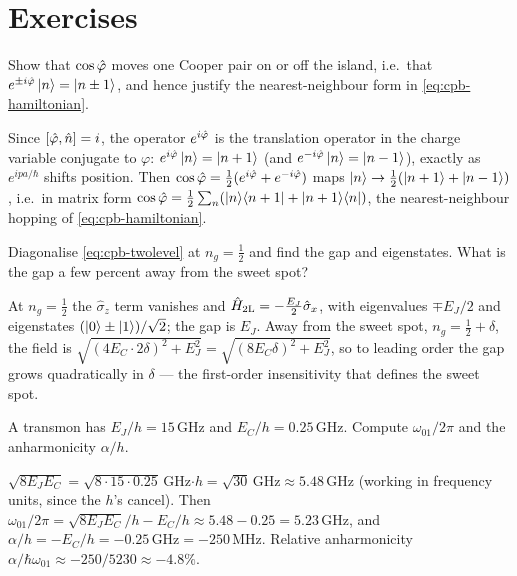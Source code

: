 \section*{Exercises}

\begin{exercise}
Show that $\cos\hat{\varphi}$ moves one Cooper pair on or off the island,
i.e.\ that
$e^{\pm i\hat{\varphi}}\ket n=\ket{n\pm1}$, and hence justify the
nearest-neighbour form in \cref{eq:cpb-hamiltonian}.
\begin{solution}
Since $\comm{\op\varphi}{\op n}=i$, the operator $e^{i\hat{\varphi}}$ is
the translation operator in the charge variable conjugate to
$\varphi$: $e^{i\hat{\varphi}}\ket n=\ket{n+1}$ (and $e^{-i\hat{\varphi}}\ket n=\ket{n-1}$),
exactly as $e^{ipa/\hbar}$ shifts position. Then
$\cos\hat{\varphi}=\tfrac12(e^{i\hat{\varphi}}+e^{-i\hat{\varphi}})$ maps
$\ket n\to\tfrac12(\ket{n+1}+\ket{n-1})$, i.e.\ in matrix form
$\cos\hat{\varphi}=\tfrac12\sum_n(\ket n\!\bra{n+1}+\ket{n+1}\!\bra n)$,
the nearest-neighbour hopping of \cref{eq:cpb-hamiltonian}.
\end{solution}
\end{exercise}

\begin{exercise}
Diagonalise \cref{eq:cpb-twolevel} at $n_g=\tfrac12$ and find the gap
and eigenstates. What is the gap a few percent away from the sweet
spot?
\begin{solution}
At $n_g=\tfrac12$ the $\hat\sigma_z$ term vanishes and
$\hat{H}_{\rm 2L}=-\tfrac{E_J}{2}\hat\sigma_x$, with eigenvalues
$\mp E_J/2$ and eigenstates $(\ket0\pm\ket1)/\sqrt2$; the gap is $E_J$.
Away from the sweet spot, $n_g=\tfrac12+\delta$, the field is
$\sqrt{(4E_C\cdot2\delta)^2+E_J^2}=\sqrt{(8E_C\delta)^2+E_J^2}$, so to
leading order the gap grows quadratically in $\delta$ --- the
first-order insensitivity that defines the sweet spot.
\end{solution}
\end{exercise}

\begin{exercise}
A transmon has $E_J/h=15\,$GHz and $E_C/h=0.25\,$GHz. Compute
$\omega_{01}/2\pi$ and the anharmonicity $\alpha/h$.
\begin{solution}
$\sqrt{8E_JE_C}=\sqrt{8\cdot15\cdot0.25}\,$GHz$\cdot h
=\sqrt{30}\,$GHz$\approx5.48\,$GHz (working in frequency units, since
the $h$'s cancel). Then
$\omega_{01}/2\pi=\sqrt{8E_JE_C}/h-E_C/h\approx5.48-0.25=5.23\,$GHz, and
$\alpha/h=-E_C/h=-0.25\,$GHz$=-250\,$MHz. Relative anharmonicity
$\alpha/\hbar\omega_{01}\approx-250/5230\approx-4.8\%$.
\end{solution}
\end{exercise}

